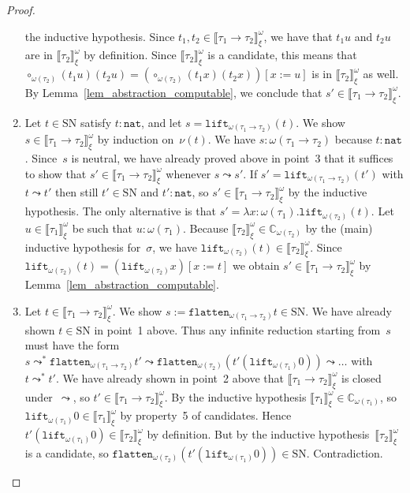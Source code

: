 \documentclass[runningheads,a4paper]{llncs}
\newcommand{\arrtype}{\rightarrow}
\newcommand{\subst}[2]{#1:=#2}
\newcommand{\nat}{\mathtt{nat}}
\newcommand{\flatten}{\mathtt{flatten}}
\newcommand{\lift}{\mathtt{lift}}
\newcommand{\SN}{\mathrm{SN}}
\newcommand{\Cb}{\mathbb{C}}
\newcommand{\val}[3]{\ensuremath{\llbracket#1\rrbracket_{#2}^{#3}}}
\begin{document}
\begin{proof}
\begin{enumerate}
    the inductive hypothesis. Since $t_1,t_2 \in
    \val{\tau_1\arrtype\tau_2}{\xi}{\omega}$, we have that $t_1 u$ and
    $t_2 u$ are in $\val{\tau_2}{\xi}{\omega}$ by definition. Since
    $\val{\tau_2}{\xi}{\omega}$ is a candidate, this means that
    $\circ_{\omega(\tau_2)} (t_1 u) (t_2 u) = (\circ_{\omega(\tau_2)}
    (t_1 x) (t_2 x))[x:=u]$ is in $\val{\tau_2}{\xi}{\omega}$ as well.
    By Lemma~\ref{lem_abstraction_computable}, we conclude that $s'
    \in \val{\tau_1\arrtype\tau_2}{\xi}{\omega}$.
  \item Let $t \in \SN$ satisfy $t : \nat$, and let $s =
    \lift_{\omega(\tau_1\arrtype\tau_2)}(t)$. We show $s \in
    \val{\tau_1\arrtype\tau_2}{\xi}{\omega}$ by induction
    on~$\nu(t)$. We have $s : \omega(\tau_1\arrtype\tau_2)$ because $t
    : \nat$. Since~$s$ is neutral, we have already proved above in
    point~3 that it suffices to show that $s' \in
    \val{\tau_1\arrtype\tau_2}{\xi}{\omega}$ whenever $s \leadsto
    s'$. If $s' = \lift_{\omega(\tau_1\arrtype\tau_2)}(t')$ with $t
    \leadsto t'$ then still $t' \in \SN$ and $t' : \nat$, so $s' \in
    \val{\tau_1\arrtype\tau_2}{\xi}{\omega}$ by the inductive
    hypothesis. The only alternative is that $s' = \lambda x :
    \omega(\tau_1) . \lift_{\omega(\tau_2)}(t)$. Let $u \in
    \val{\tau_1}{\xi}{\omega}$ be such that $u :
    \omega(\tau_1)$. Because $\val{\tau_2}{\xi}{\omega} \in
    \Cb_{\omega(\tau_2)}$ by the (main) inductive hypothesis
    for~$\sigma$, we have $\lift_{\omega(\tau_2)}(t) \in
    \val{\tau_2}{\xi}{\omega}$. Since $\lift_{\omega(\tau_2)}(t) =
    (\lift_{\omega(\tau_2)}x)[\subst{x}{t}]$ we obtain $s' \in
    \val{\tau_1\arrtype\tau_2}{\xi}{\omega}$ by
    Lemma~\ref{lem_abstraction_computable}.
  \item Let $t \in \val{\tau_1\arrtype\tau_2}{\xi}{\omega}$.  We show
    $s := \flatten_{\omega(\tau_1\arrtype\tau_2)}t \in \SN$. We have
    already shown $t \in \SN$ in point~1 above. Thus any infinite
    reduction starting from~$s$ must have the form $s \leadsto^*
    \flatten_{\omega(\tau_1\arrtype\tau_2)}t' \leadsto
    \flatten_{\omega(\tau_2)}(t' (\lift_{\omega(\tau_1)}0)) \leadsto
    \ldots$ with $t \leadsto^* t'$. We have already shown in point~2
    above that $\val{\tau_1\arrtype\tau_2}{\xi}{\omega}$ is closed
    under~$\leadsto$, so $t' \in
    \val{\tau_1\arrtype\tau_2}{\xi}{\omega}$. By the inductive
    hypothesis $\val{\tau_1}{\xi}{\omega} \in\Cb_{\omega(\tau_1)}$, so
    $\lift_{\omega(\tau_1)}0 \in \val{\tau_1}{\xi}{\omega}$ by
    property~5 of candidates. Hence $t' (\lift_{\omega(\tau_1)}0) \in
    \val{\tau_2}{\xi}{\omega}$ by definition. But by the inductive
    hypothesis~$\val{\tau_2}{\xi}{\omega}$ is a candidate, so
    $\flatten_{\omega(\tau_2)}(t'(\lift_{\omega(\tau_1)}0))\in\SN$. Contradiction.
  \end{enumerate}


\end{proof}
\end{document}
